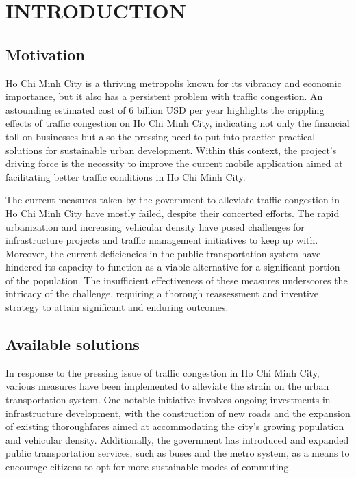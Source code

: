 %
%
\section{INTRODUCTION}

\subsection{Motivation}

Ho Chi Minh City is a thriving metropolis known for its vibrancy and economic importance, but it also has a persistent problem with traffic congestion. An astounding estimated cost of 6 billion USD per year \cite{congestion-damage} highlights the crippling effects of traffic congestion on Ho Chi Minh City, indicating not only the financial toll on businesses but also the pressing need to put into practice practical solutions for sustainable urban development. Within this context, the project's driving force is the necessity to improve the current mobile application aimed at facilitating better traffic conditions in Ho Chi Minh City. \cite{utraffic-mobile}

The current measures taken by the government to alleviate traffic congestion in Ho Chi Minh City have mostly failed, despite their concerted efforts. The rapid urbanization and increasing vehicular density have posed challenges for infrastructure projects and traffic management initiatives to keep up with. Moreover, the current deficiencies in the public transportation system have hindered its capacity to function as a viable alternative for a significant portion of the population. The insufficient effectiveness of these measures underscores the intricacy of the challenge, requiring a thorough reassessment and inventive strategy to attain significant and enduring outcomes.

\subsection{Available solutions}

In response to the pressing issue of traffic congestion in Ho Chi Minh City, various measures have been implemented to alleviate the strain on the urban transportation system. One notable initiative involves ongoing investments in infrastructure development, with the construction of new roads and the expansion of existing thoroughfares aimed at accommodating the city's growing population and vehicular density. Additionally, the government has introduced and expanded public transportation services, such as buses and the metro system, as a means to encourage citizens to opt for more sustainable modes of commuting.

